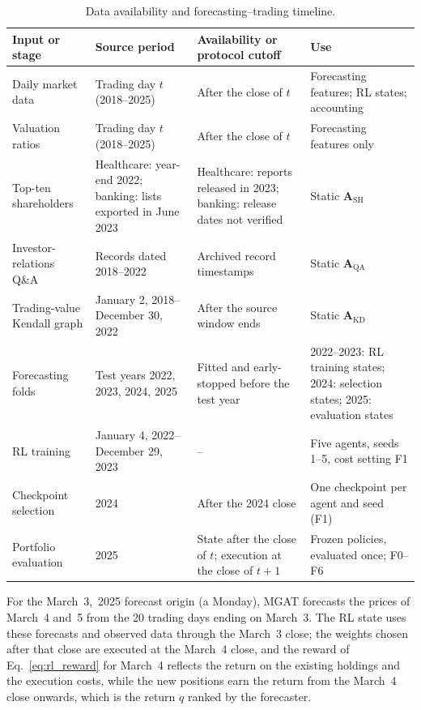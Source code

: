 \begin{table}[!t]
\centering
\small
\caption{{\color{blue}Data availability and forecasting--trading timeline.}}
\label{tab:timeline}
\setlength{\tabcolsep}{3pt}
\renewcommand{\arraystretch}{1.12}
\color{blue}
\begin{tabular}{@{}p{2.3cm}p{3.3cm}p{3.3cm}p{3.5cm}@{}}
\toprule
Input or stage & Source period & Availability or protocol cutoff & Use \\
\midrule
Daily market data & Trading day $t$ (2018--2025) & After the close of $t$ & Forecasting features; RL states; accounting \\
Valuation ratios & Trading day $t$ (2018--2025) & After the close of $t$ & Forecasting features only \\
Top-ten shareholders & Healthcare: year-end 2022; banking: lists exported in June 2023 & Healthcare: reports released in 2023; banking: release dates not verified & Static $\mathbf{A}_{\mathrm{SH}}$ \\
Investor-relations Q\&A & Records dated 2018--2022 & Archived record timestamps & Static $\mathbf{A}_{\mathrm{QA}}$ \\
Trading-value Kendall graph & January 2, 2018--December 30, 2022 & After the source window ends & Static $\mathbf{A}_{\mathrm{KD}}$ \\
Forecasting folds & Test years 2022, 2023, 2024, 2025 & Fitted and early-stopped before the test year & 2022--2023: RL training states; 2024: selection states; 2025: evaluation states \\
RL training & January 4, 2022--December 29, 2023 & -- & Five agents, seeds 1--5, cost setting F1 \\
Checkpoint selection & 2024 & After the 2024 close & One checkpoint per agent and seed (F1) \\
Portfolio evaluation & 2025 & State after the close of $t$; execution at the close of $t+1$ & Frozen policies, evaluated once; F0--F6 \\
\bottomrule
\end{tabular}
\end{table}

{\color{blue}
For the March~3,~2025 forecast origin (a Monday), MGAT forecasts the prices of March~4 and~5 from the 20 trading days ending on March~3. The RL state uses these forecasts and observed data through the March~3 close; the weights chosen after that close are executed at the March~4 close, and the reward of Eq.~\eqref{eq:rl_reward} for March~4 reflects the return on the existing holdings and the execution costs, while the new positions earn the return from the March~4 close onwards, which is the return $q$ ranked by the forecaster.
\par}
